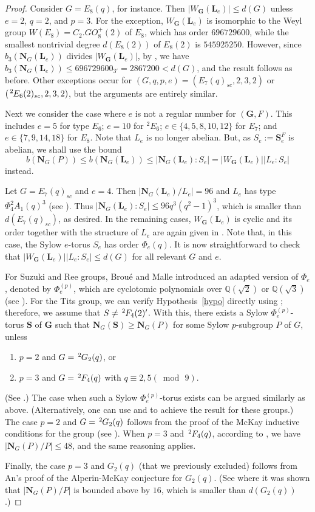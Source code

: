 \documentclass[12pt]{amsart}
\theoremstyle{plain}
\theoremstyle{definition}
\numberwithin{equation}{section}
\newcommand{\bG}{\mathbf{G}}
\newcommand{\bL}{\mathbf{L}}
\newcommand{\bN}{\mathbf{N}}
\newcommand{\QQ}{{\mathbb Q}}
\newcommand{\ta}{\hspace{0.5mm}^{2}\hspace*{-0.2mm}}
\newcommand{\bS}{{\mathbf{S}}}
\begin{document}
\begin{proof}
Consider $G=E_8(q)$, for instance. Then $|W_\bG(\bL_e)|\leq d(G)$
unless $e=2$, $q=2$, and $p=3$. For the exception, $W_\bG(\bL_e)$ is
isomorphic to the Weyl group $W(E_8)=C_2.GO_8^+(2)$ of $E_8$, which
has order $696729600$, while the smallest nontrivial degree
$d(E_8(2))$ of $E_8(2)$ is $545925250$. However, since
$b_3(\bN_G(\bL_e))$ divides $|W_\bG(\bL_e)|$, by
\cite[Corollary~11.29]{Is}, we have $b_3(\bN_G(\bL_e))\leq
696729600_{3'}=2867200< d(G)$, and the result follows as before.
Other exceptions occur for $(G,q,p,e)=(E_7(q)_{sc},2,3,2)$ or $(\ta
E_6(2)_{sc},2,3,2)$, but the arguments are entirely similar.

Next we consider the case where $e$ is not a regular number for
$(\bG,F)$. This includes $e=5$ for type $E_6$; $e=10$ for $^2E_6$;
$e\in\{4,5,8,10,12\}$ for $E_7$; and $e\in\{7,9,14,18\}$ for $E_8$.
Note that $L_e$ is no longer abelian. But, as $S_e:=\bS_e^F$ is
abelian, we shall use the bound
\[
b(\bN_G(P))\leq b(\bN_G(\bL_e))\leq
|\bN_G(\bL_e):S_e|=|W_\bG(\bL_e)||L_e:S_e|
\]
instead.

Let $G=E_7(q)_{sc}$ and $e=4$. Then $|\bN_G(\bL_e)/L_e|=96$ and
$L_e$ has type $\Phi_4^2A_1(q)^3$ (see \cite[Table~3.3]{GM20}). Thus
$|\bN_G(\bL_e):S_e|\leq 96q^3(q^2-1)^3$, which is smaller than
$d(E_7(q)_{sc})$, as desired. In the remaining cases, $W_\bG(\bL_e)$
is cyclic and its order together with the structure of $L_e$ are
again given in \cite[Table~8.1]{BM93}. Note that, in this case, the
Sylow $e$-torus $S_e$ has order $\Phi_e(q)$. It is now
straightforward to check that $|W_\bG(\bL_e)||L_e:S_e|\leq d(G)$ for
all relevant $G$ and $e$.

For Suzuki and Ree groups, Brou\'{e} and Malle introduced an adapted
version of $\Phi_e$, denoted by $\Phi_e^{(p)}$, which are cyclotomic
polynomials over $\QQ(\sqrt{2})$ or $\QQ(\sqrt{3})$ (see
\cite[\S8]{Malle07}). For the Tits group, we can verify
Hypothesis~\ref{hypo} directly using \cite{GAP}; therefore, we
assume that $S\neq \ta F_4(2)'$. With this, there exists a Sylow
$\Phi_e^{(p)}$-torus $\bS$ of $\bG$ such that $\bN_G(\bS)\geq
\bN_G(P)$ for some Sylow $p$-subgroup $P$ of $G$, unless
\begin{enumerate}[\rm(i)]
\item $p=2$ and $G = \ta G_2(q)$, or
\item $p=3$ and $G=\ta F_4(q)$ with $q\equiv2, 5 (\bmod\, 9)$.
\end{enumerate}
(See \cite[Theorem~8.4]{Malle07}.) The case when such a Sylow
$\Phi_e^{(p)}$-torus exists can be argued similarly as above.
(Alternatively, one can use \cite[\S16 and \S17]{IMN07} and
\cite{An98} to achieve the result for these groups.) The case $p=2$
and $G = \ta G_2(q)$ follows from the proof of the McKay inductive
conditions for the group (see \cite[\S17]{IMN07}). When $p=3$ and
$\ta F_4(q)$, according to \cite[(2B)]{An98}, we have
$|\bN_G(P)/P|\leq 48$, and the same reasoning applies.

Finally, the case $p=3$ and $G_2(q)$ (that we previously excluded)
follows from An's proof of the Alperin-McKay conjecture for
$G_2(q)$. (See \cite[p.~190]{An94} where it was shown that
$|\bN_G(P)/P|$ is bounded above by $16$, which is smaller than
$d(G_2(q))$.)
\end{proof}
\end{document}
